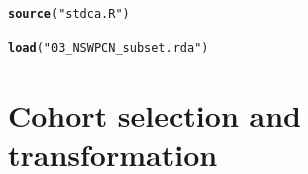 \documentclass{article}\usepackage[]{graphicx}\usepackage[]{color}
\makeatletter
\newcommand{\hlstr}[1]{\textcolor[rgb]{0.192,0.494,0.8}{#1}}%
\newcommand{\hlstd}[1]{\textcolor[rgb]{0.345,0.345,0.345}{#1}}%
\newcommand{\hlkwd}[1]{\textcolor[rgb]{0.737,0.353,0.396}{\textbf{#1}}}%
\newenvironment{kframe}{%
 \def\at@end@of@kframe{}%
 \ifinner\ifhmode%
  \def\at@end@of@kframe{\end{minipage}}%
  \begin{minipage}{\columnwidth}%
 \fi\fi%
 \def\FrameCommand##1{\hskip\@totalleftmargin \hskip-\fboxsep
 \colorbox{shadecolor}{##1}\hskip-\fboxsep
     \hskip-\linewidth \hskip-\@totalleftmargin \hskip\columnwidth}%
 \MakeFramed {\advance\hsize-\width
   \@totalleftmargin\z@ \linewidth\hsize
   \@setminipage}}%
 {\par\unskip\endMakeFramed%
 \at@end@of@kframe}
\newenvironment{knitrout}{}{} %
\makeatother
\begin{document}
\begin{knitrout}
\begin{kframe}
{\ttfamily\noindent\itshape\color{messagecolor}{\#\# Loading required package: pec\\\#\# Loading required package: mvtnorm\\\#\# Loading required package: timereg}}\begin{alltt}
\hlkwd{source}\hlstd{(}\hlstr{"stdca.R"}\hlstd{)}

\hlkwd{load}\hlstd{(}\hlstr{"03_NSWPCN_subset.rda"}\hlstd{)}
\end{alltt}
\end{kframe}
\end{knitrout}


\section{Cohort selection and transformation}
\end{document}
